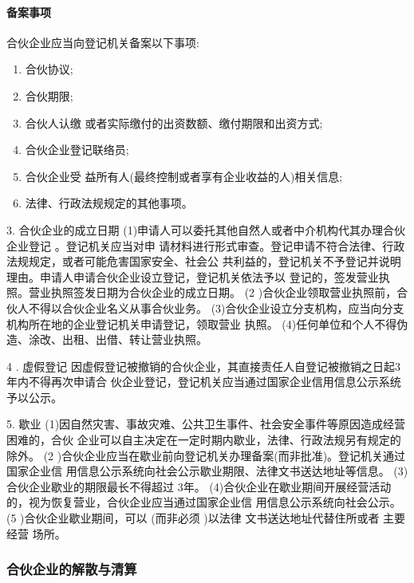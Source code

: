 \documentclass[UTF8,12pt]{ctexart}
\numberwithin{equation}{section} %
\numberwithin{figure}{section}
\numberwithin{table}{section}
\begin{document}
	\paragraph{备案事项}
	合伙企业应当向登记机关备案以下事项:
	\begin{enumerate}
		\item 合伙协议;
		
		\item 合伙期限;
		
		\item 合伙人认缴 或者实际缴付的出资数额、缴付期限和出资方式;
		
		\item 合伙企业登记联络员;
		
		\item 合伙企业受 益所有人(最终控制或者享有企业收益的人)相关信息;
		
		\item 法律、行政法规规定的其他事项。
	\end{enumerate}
	
	3. 合伙企业的成立日期 (1)申请人可以委托其他自然人或者中介机构代其办理合伙企业登记 。登记机关应当对申
	请材料进行形式审查。登记申请不符合法律、行政法规规定，或者可能危害国家安全、社会公 共利益的，登记机关不予登记并说明理由。申请人申请合伙企业设立登记，登记机关依法予以 登记的，签发营业执照。营业执照签发日期为合伙企业的成立日期。
	(2 )合伙企业领取营业执照前，合伙人不得以合伙企业名义从事合伙业务。
	(3)合伙企业设立分支机构，应当向分支机构所在地的企业登记机关申请登记，领取营业 执照。
	(4)任何单位和个人不得伪造、涂改、出租、出借、转让营业执照。
	
	4 . 虚假登记
	因虚假登记被撤销的合伙企业，其直接责任人自登记被撤销之日起3 年内不得再次申请合
	伙企业登记，登记机关应当通过国家企业信用信息公示系统予以公示。 
	
	5. 歇业 (1)因自然灾害、事故灾难、公共卫生事件、社会安全事件等原因造成经营困难的，合伙
	企业可以自主决定在一定时期内歇业，法律、行政法规另有规定的除外。
	(2 )合伙企业应当在歇业前向登记机关办理备案(而非批准)。登记机关通过国家企业信 用信息公示系统向社会公示歇业期限、法律文书送达地址等信息。 (3)合伙企业歇业的期限最长不得超过 3年。 (4)合伙企业在歇业期间开展经营活动的，视为恢复营业，合伙企业应当通过国家企业信 用信息公示系统向社会公示。
	(5 )合伙企业歇业期间，可以 (而非必须 )以法律 文书送达地址代替住所或者 主要经营 场所。
	
	
	
	\subsubsection{合伙企业的解散与清算}
	
\end{document}
